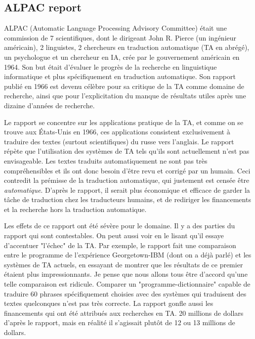 \documentclass[11pt,a4paper]{report}
\begin{document}
  \subsection*{ALPAC report} 
  ALPAC (Automatic Language Processing Advisory Committee) était une commission de 7 scientifiques, 
  dont le dirigeant John R. Pierce (un ingénieur américain), 2 linguistes, 2 chercheurs en traduction 
  automatique (TA en abrégé), un psychologue et un chercheur en IA, 
  crée par le gouvernement américain en 1964. Son but était d'évaluer le progrès de la 
  recherche en linguistique informatique et plus spécifiquement en traduction automatique. Son rapport 
  publié en 1966 est devenu célèbre pour sa critique de la TA comme domaine de recherche, 
  ainsi que pour l'explicitation du manque de résultats utiles après une dizaine d'années de recherche. 

  Le rapport se concentre sur les applications pratique de la TA, et comme on se trouve aux 
  États-Unis en 1966, ces applications consistent exclusivement à traduire des textes 
  (surtout scientifiques) du russe vers l'anglais. Le rapport répète que l'utilisation des 
  systèmes de TA tels qu'ils sont actuellement n'est pas envisageable. Les textes traduits 
  automatiquement ne sont pas très compréhensibles et ils ont donc besoin d'être revu et 
  corrigé par un humain. Ceci contredit la prémisse de la traduction automatique, qui justement est
  censée être \textit{automatique}. D'après le rapport, il serait plus économique et efficace 
  de garder la tâche de traduction chez les traducteurs humains, et de rediriger les financements 
  et la recherche hors la traduction automatique. 

  Les effets de ce rapport ont été sévère pour le domaine. Il y a des parties du rapport qui sont 
  contestables. On peut aussi voir en le lisant qu'il essaye d'accentuer "l'échec" de la TA. 
  Par exemple, le rapport fait une comparaison entre le programme de l'expérience Georgetown-IBM 
  (dont on a déjà parlé) et les systèmes de TA actuels, en essayant de montrer que les résultats 
  de ce premier étaient plus impressionnants. Je pense que nous allons tous être 
  d'accord qu'une telle comparaison est ridicule. Comparer un "programme-dictionnaire" capable 
  de traduire 60 phrases spécifiquement choisies avec des systèmes qui traduisent des textes 
  quelconques n'est pas très correcte. La rapport gonfle aussi les financements qui ont 
  été attribués aux recherches en TA. 20 millions de dollars d'après le rapport, mais en réalité 
  il s'agissait plutôt de 12 ou 13 millions de dollars. 
  
\end{document}

